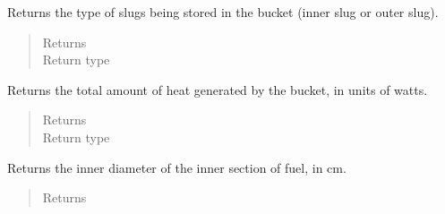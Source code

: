 \documentclass[letterpaper,10pt,openany,oneside,english]{sphinxmanual}
\begin{document}
\begin{fulllineitems}

\begin{fulllineitems}
\label{\detokenize{support_rst/fuel_bucket:fuel_bucket.FuelBucket.get_slug_type}}
Returns the type of slugs being stored in the bucket (inner slug or
outer slug).
\begin{quote}\begin{description}
\item[{Returns}] \leavevmode
{}

\item[{Return type}] \leavevmode
{}

\end{description}\end{quote}

\end{fulllineitems}


\begin{fulllineitems}
\label{\detokenize{support_rst/fuel_bucket:fuel_bucket.FuelBucket.heat_pwr}}
Returns the total amount of heat generated by the bucket, in units of
watts.
\begin{quote}\begin{description}
\item[{Returns}] \leavevmode
{}

\item[{Return type}] \leavevmode
{}

\end{description}\end{quote}

\end{fulllineitems}


\begin{fulllineitems}
\label{\detokenize{support_rst/fuel_bucket:fuel_bucket.FuelBucket.inner_slug_id}}
Returns the inner diameter of the inner section of fuel, in cm.
\begin{quote}\begin{description}
\item[{Returns}] \leavevmode
{}


\end{description}
\end{quote}
\end{fulllineitems}
\end{fulllineitems}
\end{document}
